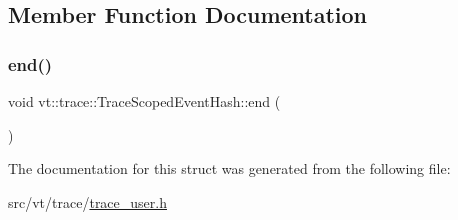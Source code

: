\subsection{Member Function Documentation}
\mbox{\label{structvt_1_1trace_1_1_trace_scoped_event_hash_ae9d589c131c9fbb66b1a1f32304d661f}} 
\subsubsection{\texorpdfstring{end()}{end()}}
{\footnotesize\ttfamily void vt\+::trace\+::\+Trace\+Scoped\+Event\+Hash\+::end (\begin{DoxyParamCaption}{ }\end{DoxyParamCaption})\hspace{0.3cm}{\ttfamily [inline]}}



The documentation for this struct was generated from the following file\+:\begin{DoxyCompactItemize}
\item 
src/vt/trace/\hyperlink{trace__user_8h}{trace\+\_\+user.\+h}\end{DoxyCompactItemize}
